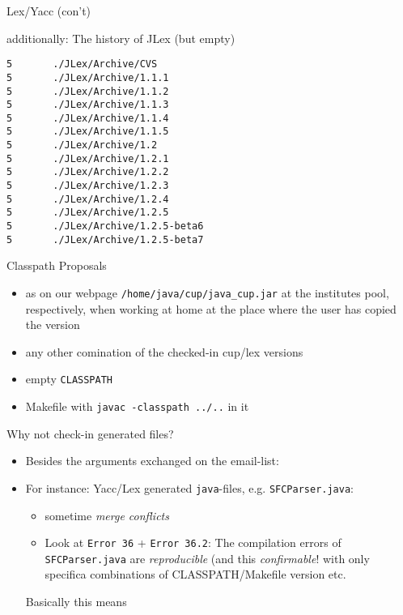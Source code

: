 \begin{myslide}{Lex/Yacc (con't)}
    
additionally: The history of JLex (but empty)

\begin{verbatim}
5       ./JLex/Archive/CVS
5       ./JLex/Archive/1.1.1
5       ./JLex/Archive/1.1.2
5       ./JLex/Archive/1.1.3
5       ./JLex/Archive/1.1.4
5       ./JLex/Archive/1.1.5
5       ./JLex/Archive/1.2
5       ./JLex/Archive/1.2.1
5       ./JLex/Archive/1.2.2
5       ./JLex/Archive/1.2.3
5       ./JLex/Archive/1.2.4
5       ./JLex/Archive/1.2.5
5       ./JLex/Archive/1.2.5-beta6
5       ./JLex/Archive/1.2.5-beta7
\end{verbatim}
    
\end{myslide}  

\begin{myslide}{Classpath}
  Proposals
  \begin{itemize}
  \item as on our webpage \verb+/home/java/cup/java_cup.jar+ at the
    institutes pool, respectively, when working at home at the place where
    the user has copied the version
  \item any other comination of the checked-in cup/lex versions
  \item empty \texttt{CLASSPATH}
  \item Makefile with \verb+javac -classpath ../..+ in it
  \end{itemize}
\end{myslide}

\begin{myslide}{Why not check-in generated files?}
  \begin{itemize}
  \item Besides the arguments exchanged on the email-list:
  \item For instance: Yacc/Lex generated \texttt{java}-files, e.g.
    \texttt{SFCParser.java}:
    \begin{itemize}
    \item sometime \emph{merge conflicts}
    \item Look at \texttt{Error 36} + \texttt{Error 36.2}: The compilation
      errors of \texttt{SFCParser.java} are \emph{reproducible} (and this
      \emph{confirmable}! with only specifica combinations of
      CLASSPATH/Makefile version etc. 
    \end{itemize}
    Basically this means
    \begin{center}
    \end{center}
  \end{itemize}
  
\end{myslide}





